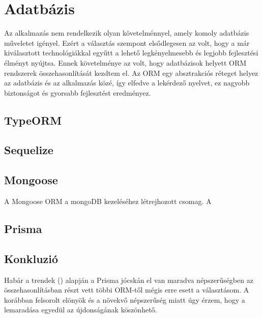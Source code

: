 \section{Adatbázis}
Az alkalmazás nem rendelkezik olyan követelménnyel, amely komoly adatbázis műveletet igényel.
Ezért a választás szempont elsődlegesen az volt, hogy a már kiválasztott technológiákkal egyűtt a lehető legkényelmesebb és legjobb fejlesztési élményt nyújtsa. Ennek követelménye az volt, hogy adatbázisok helyett ORM rendszerek összehasonlítását kezdtem el.
Az ORM egy absztrakciós réteget helyez az adatbázis és az alkalmazás közé, így elfedve a lekérdező nyelvet, ez nagyobb biztonságot és gyorsabb fejlesztést eredményez.

\subsection{TypeORM}


\subsection{Sequelize}

\subsection{Mongoose}
A Mongoose ORM a mongoDB kezeléséhez létrejhozott csomag. A 

\subsection{Prisma}


\subsection{Konkluzió}
Habár a trendek () alapján a Prisma jócskán el van maradva népszerűségben az összehasonlításban részt vett többi ORM-től mégis erre esett a választásom.
A korábban felsorolt elönyök és a növekvő népszerűség miatt úgy érzem, hogy a lemaradása egyedül az újdonságának köszönhető.


